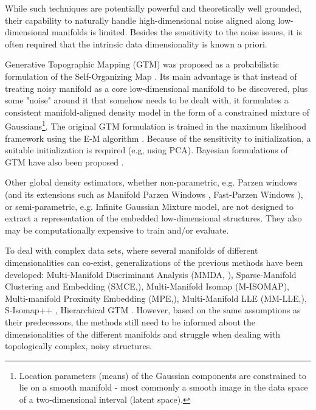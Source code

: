 While such techniques are potentially powerful and theoretically well grounded, their capability to naturally handle high-dimensional noise aligned along low-dimensional manifolds is limited. Besides the sensitivity to the noise issues, it is often required that the intrinsic data dimensionality is known a priori. 

Generative Topographic Mapping (GTM) \cite{Bishop1998GTMTG} was proposed as a probabilistic formulation of the Self-Organizing Map \cite{Kohonen1982}. Its main advantage is that instead of treating noisy manifold as a core low-dimensional manifold to be discovered, plus some "noise" around it that somehow needs to be dealt with, it formulates a consistent manifold-aligned density model in the form of a constrained mixture of Gaussians\footnote{Location parameters (means) of the Gaussian components are constrained to lie on a smooth manifold - most commonly a smooth image in the data space of a two-dimensional interval (latent space).}. 
The original GTM formulation is trained in the maximum likelihood framework using the E-M algorithm \cite{10.2307/2984875}. Because of the sensitivity to initialization, a suitable initialization is required (e.g, using PCA). Bayesian formulations of GTM have also been proposed
\cite{Olier2008VariationalBG}.

Other global density estimators, whether non-parametric, e.g. Parzen windows \cite{parzen1962estimation} (and its extensions such as
Manifold Parzen Windows \cite{NIPS2002_2203}, Fast-Parzen Windows \cite{5178637}), or semi-parametric, e.g. Infinite Gaussian Mixture model\cite{10.5555/3009657.3009736}, are not designed to extract a representation of the embedded low-dimensional structures.
They also may be computationally expensive to train and/or evaluate. 

To deal with complex data sets, where several manifolds of different dimensionalities can co-exist, generalizations of the previous methods have been developed: Multi-Manifold Discriminant Analysis (MMDA, \cite{Yang:2011:MDA:1963661.1963809}), Sparse-Manifold 
Clustering and Embedding (SMCE,\cite{NIPS2011_4246}), Multi-Manifold Isomap (M-ISOMAP\cite{Fan2012IsometricML}), Multi-manifold Proximity Embedding  (MPE,\cite{Fan:2016:EIM:2903049.2903101}), Multi-Manifold LLE 
(MM-LLE,\cite{Hettiarachchi:2015:MLL:2791619.2792198}), S-Isomap++ 
\cite{2017arXiv171006462M}, Hierarchical GTM \cite{Tino_PAMI_2002}. However, based on the same assumptions as their predecessors, the methods still need to be informed about the dimensionalities of the different manifolds {and struggle when dealing with topologically complex, noisy structures}.

